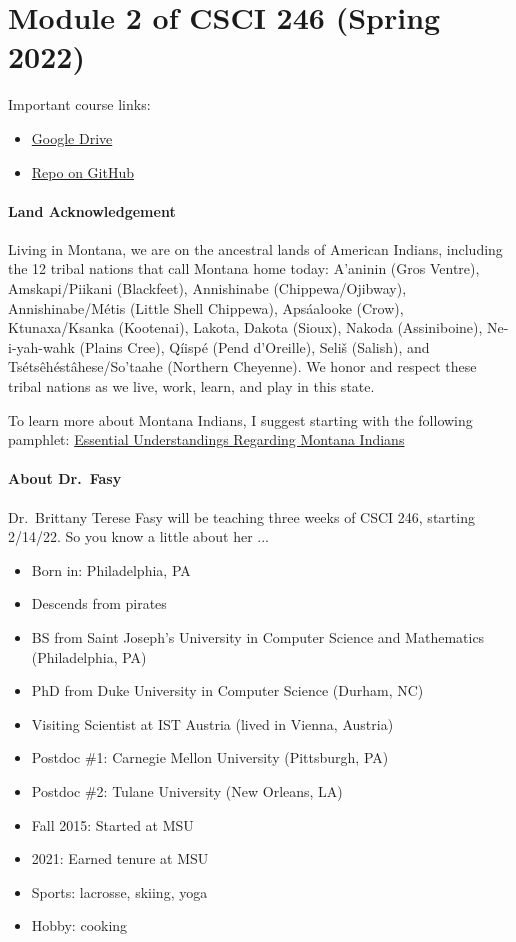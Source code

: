\section*{Module 2 of CSCI 246 (Spring 2022)}

Important course links:
\begin{itemize}
    \item \href{https://drive.google.com/drive/folders/15M83uQne8Y-jddRmr5QYIur-tM_K77VQ?usp=sharing}{Google
    Drive}
    \item \href{https://github.com/msu/csci-246-spring2022}{Repo on GitHub}
\end{itemize}

\paragraph{Land Acknowledgement}

Living in Montana, we are on the ancestral lands of American Indians, including
the 12 tribal nations that call Montana home today: A’aninin (Gros Ventre),
Amskapi/Piikani (Blackfeet), Annishinabe (Chippewa/Ojibway), Annishinabe/M\'etis
(Little Shell Chippewa), Apsáalooke (Crow), Ktunaxa/Ksanka (Kootenai), Lakota,
Dakota (Sioux), Nakoda (Assiniboine), Ne-i-yah-wahk (Plains Cree), Qíispé (Pend
d’Oreille), Seli\v{s} (Salish), and Tsétsêhéstâhese/So’taahe (Northern Cheyenne).
We honor and respect these tribal nations as we live, work, learn, and play in
this state.

To learn more about Montana Indians, I suggest starting with the following
pamphlet:
\href{http://opi.mt.gov/Portals/182/Page%20Files/Indian%20Education/Indian%20Education%20101/essentialunderstandings.df}{Essential Understandings Regarding Montana Indians}


\paragraph{About Dr.~Fasy}
Dr.~Brittany Terese Fasy will be teaching three weeks of CSCI 246, starting
2/14/22.  So you know a little about her ...

\begin{itemize}
    \item Born in: Philadelphia, PA
    \item Descends from pirates
    \item BS from Saint Joseph's University in Computer Science and Mathematics
        (Philadelphia, PA)
    \item PhD from Duke University in Computer Science (Durham, NC)
    \item Visiting Scientist at IST Austria (lived in Vienna, Austria)
    \item Postdoc \#1: Carnegie Mellon University (Pittsburgh, PA)
    \item Postdoc \#2: Tulane University (New Orleans, LA)
    \item Fall 2015: Started at MSU
    \item 2021: Earned tenure at MSU
    \item Sports: lacrosse, skiing, yoga
    \item Hobby: cooking
\end{itemize}

